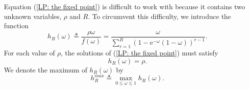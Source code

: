 \documentclass{IEEEtran}
\begin{document}
Equation (\ref{LP: the fixed point}) is difficult to work with because it contains two unknown variables, $\rho$ and $R$. To circumvent this
difficulty, we introduce the function
\begin{equation} \label{lambdaT}
h_R(\omega) \triangleq \frac{\rho \omega}{f(\omega)} = \frac{\omega}{\sum_{r=1}^{R}\left(1 - \mathrm{e}^{-\omega}(1-\omega)\right)^{r-1}}.
\end{equation}
For each value of $\rho$, the solutions of (\ref{LP: the fixed point}) must satisfy
\begin{equation} \label{lambdaT=rho}
h_R(\omega) = \rho.
\end{equation}
We denote the maximum of $h_R(\omega)$
by
 \[h^{max}_R \triangleq \max_{0 \leq \omega \leq 1}h_R(\omega).\]
\end{document}
